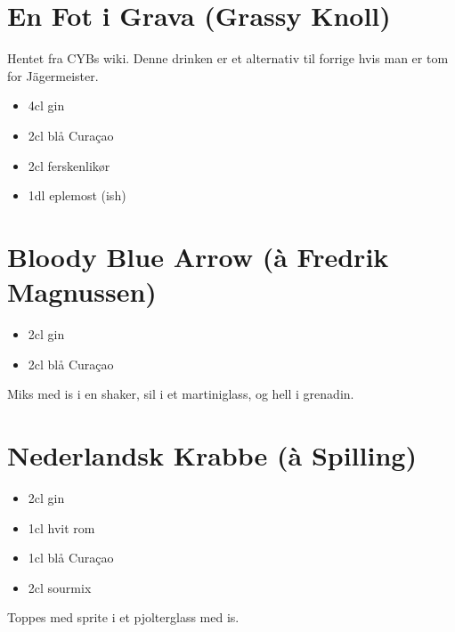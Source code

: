 \section*{En Fot i Grava (Grassy Knoll)}

Hentet fra CYBs wiki. Denne drinken er et alternativ til forrige hvis man er tom for Jägermeister.

\begin{itemize}
	\item 4cl gin
	\item 2cl blå Curaçao
	\item 2cl ferskenlikør
	\item 1dl eplemost (ish)
\end{itemize}

\section*{Bloody Blue Arrow (à Fredrik Magnussen)}

\begin{itemize}
	\item 2cl gin
	\item 2cl blå Curaçao
\end{itemize}

Miks med is i en shaker, sil i et martiniglass, og hell i grenadin.

\section*{Nederlandsk Krabbe (à Spilling)}

\begin{itemize}
	\item 2cl gin
	\item 1cl hvit rom
	\item 1cl blå Curaçao
	\item 2cl sourmix
\end{itemize}

Toppes med sprite i et pjolterglass med is.
